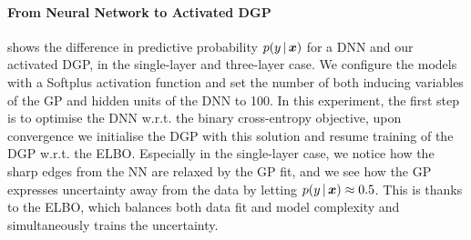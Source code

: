 


\paragraph{From Neural Network to Activated DGP}  shows the difference in predictive probability $p(y \,|\, \bm{x})$ for a DNN and our activated DGP, in the single-layer and three-layer case. We configure the models with a Softplus activation function and set the number of both inducing variables of the GP and hidden units of the DNN to 100. In this experiment, the first step is to optimise the DNN w.r.t. the binary cross-entropy objective, upon convergence we initialise the DGP with this solution and resume training of the DGP w.r.t. the ELBO. Especially in the single-layer case, we notice how the sharp edges from the NN are relaxed by the GP fit, and we see how the GP expresses uncertainty away from the data by letting $p(y \,|\, \bm{x}) \approx 0.5$. This is thanks to the ELBO, which balances both data fit and model complexity and simultaneously trains the uncertainty.

